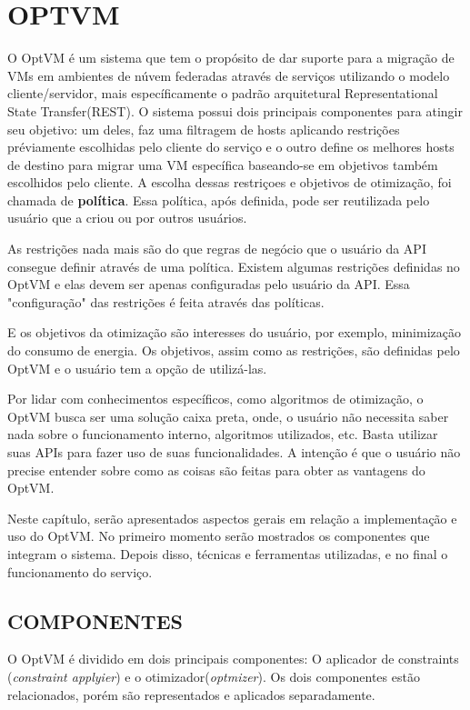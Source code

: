 \chapter{OPTVM}

O OptVM é um sistema que tem o propósito de dar suporte para a migração de VMs em ambientes de núvem federadas
através de serviços utilizando o modelo cliente/servidor, mais específicamente o padrão arquitetural 
Representational State Transfer(REST). 
O sistema possui dois principais componentes para atingir seu objetivo: 
um deles, faz uma filtragem de hosts aplicando restrições préviamente escolhidas pelo cliente do serviço e o
outro define os melhores hosts de destino para migrar uma VM específica 
baseando-se em objetivos também escolhidos pelo cliente. 
A escolha dessas restriçoes e objetivos de otimização, foi
chamada de \textbf{política}. Essa política, após definida, pode ser reutilizada pelo usuário que a criou ou por outros usuários.

As restrições nada mais são do que regras de negócio que o usuário da API consegue definir através de uma política.
Existem algumas restrições definidas no OptVM e elas devem ser apenas configuradas pelo usuário da API. Essa "configuração"
das restrições é feita através das políticas.

E os objetivos da otimização são interesses do usuário, por exemplo, minimização do consumo de energia. Os objetivos,
assim como as restrições, são definidas pelo OptVM e o usuário tem a opção de utilizá-las.

Por lidar com conhecimentos específicos, como algoritmos de otimização, o OptVM busca ser uma solução caixa preta, onde, o usuário não necessita 
saber nada sobre o funcionamento interno, algoritmos utilizados, etc. Basta utilizar suas APIs para fazer uso de suas funcionalidades.
A intenção é que o usuário não precise entender sobre como as coisas são feitas para obter as vantagens do OptVM.

Neste capítulo, serão apresentados aspectos gerais em relação a implementação e uso do OptVM. 
No primeiro momento serão mostrados os componentes que integram o sistema. 
Depois disso, técnicas e ferramentas utilizadas, e no final o funcionamento do serviço. 

\section{COMPONENTES}
O OptVM é dividido em dois principais componentes: O aplicador de constraints (\textit{constraint applyier})
e o otimizador(\textit{optmizer}). Os dois componentes estão relacionados, porém são representados e 
aplicados separadamente.

